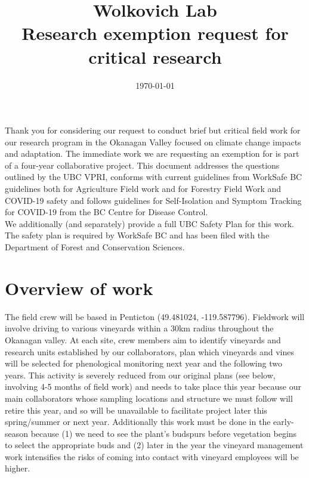 \documentclass[11pt,letter]{article}
\begin{document}

\renewcommand{\refname}{\CHead{}}

\title{Wolkovich Lab \\ Research exemption request for critical research}
\date{\today}
\maketitle

Thank you for considering our request to conduct brief but critical field work for our research program in the Okanagan Valley focused on climate change impacts and adaptation. The immediate work we are requesting an exemption for is part of a four-year collaborative project. This document addresses the questions outlined by the UBC VPRI, conforms with current guidelines from WorkSafe BC guidelines both for Agriculture Field work and for Forestry Field Work and COVID-19 safety and follows guidelines for Self-Isolation and Symptom Tracking for COVID-19 from the BC Centre for Disease Control.\\

We additionally (and separately) provide a full UBC Safety Plan for this work. The safety plan is required by WorkSafe BC and has been filed with the Department of Forest and Conservation Sciences. 

\section{Overview of work}
The field crew will be based in Penticton (49.481024, -119.587796). Fieldwork will involve driving to various vineyards within a 30km radius throughout the Okanagan valley. At each site, crew members aim to identify  vineyards and research units established by our collaborators, plan which vineyards and vines will be selected for phenological monitoring next year and the following two years. This activity is severely reduced from our original plans (see below, involving 4-5 months of field work) and needs to take place this year because our main collaborators whose sampling locations and structure we must follow will retire this year, and so will be unavailable to facilitate project later this spring/summer or next year. Additionally this work must be done in the early-season because (1) we need to see the plant's budspurs before vegetation begins to select the appropriate buds and (2) later in the year the vineyard management work intensifies the risks of coming into contact with vineyard employees will be higher.\\
\end{document}
